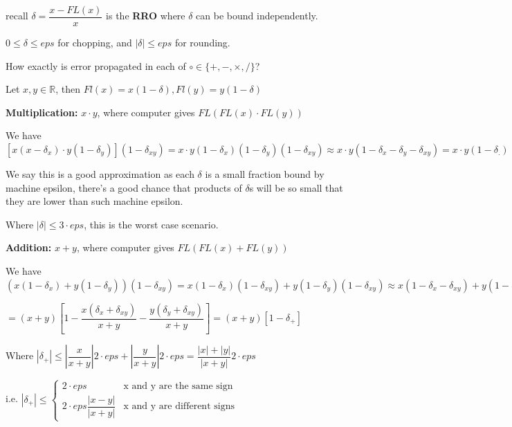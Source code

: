 \documentclass{article}
\begin{document}
recall $\delta = \dfrac{x - FL(x)}{x}$ is the \textbf{RRO} where $\delta$ can be bound independently. 

$0 \leq \delta \leq eps$ for chopping, and $| \delta | \leq eps$ for rounding. 

\vspace{0.2cm}

How exactly is error propagated in each of $\circ \in \{ +, -, \times, /\}$?

\vspace{0.1cm}

Let $x, y \in \mathbb R$, then $Fl(x) = x(1 - \delta), Fl(y) = y(1 - \delta)$

\textbf{Multiplication:} $x \cdot y$, where computer gives $FL(FL(x) \cdot FL(y))$

We have $[x(x - \delta_x)\cdot y(1 - \delta_y)](1 - \delta_{xy}) = x \cdot y (1 - \delta_x)(1 - \delta_y)(1 - \delta_{xy}) \approx x \cdot y (1 - \delta_x - \delta_y -\delta_{xy}) = x \cdot y (1 - \delta_{.})$

We say this is a good approximation as each $\delta$ is a small fraction bound by machine epsilon, there's a good chance that products of $\delta$s will be so small that they are lower than such machine epsilon.

Where $| \delta | \leq 3 \cdot eps$, this is the worst case scenario.

\pagebreak

\text{}

\textbf{Addition:} $x + y$, where computer gives $FL(FL(x) + FL(y))$

We have $(x(1 - \delta_x) + y(1 - \delta_y))(1 - \delta_{xy}) = x(1 - \delta_x)(1 - \delta_{xy}) + y(1 - \delta_y)(1 - \delta_{xy}) \approx x(1 - \delta_x - \delta_{xy}) + y(1 - \delta_{y} - \delta_{xy})$

\vspace{0.1cm}

$ = (x + y)\left[ 1 - \dfrac{x(\delta_x + \delta_{xy})}{x + y} - \dfrac{y(\delta_y + \delta_{xy})}{x + y}\right] = (x + y)[ 1 - \delta_{+}]$

Where $|\delta_{+}| \leq \left| \dfrac{x}{x + y} \right| 2 \cdot {eps} + \left| \dfrac{y}{x + y} \right|2 \cdot {eps} = \dfrac{|x| + |y|}{|x + y|} 2 \cdot {eps}$


\vspace{0.2cm}

i.e. $|\delta_{+}| \leq \begin{cases}
2 \cdot {eps} & \text{x and y are the same sign}\\
2 \cdot eps \dfrac{|x - y|}{|x + y|} & \text{x and y are different signs}
\end{cases}$
\end{document}
